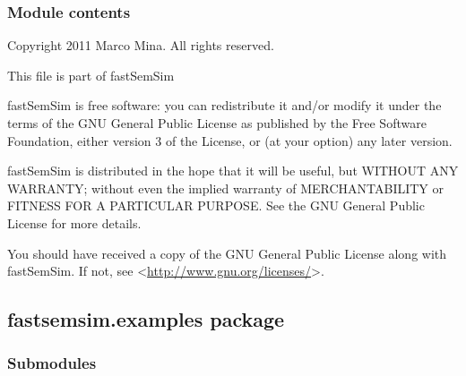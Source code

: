 \documentclass[letterpaper,10pt,english]{sphinxmanual}
\begin{document}
\begin{fulllineitems}
\begin{fulllineitems}
\label{fastsemsim.data:fastsemsim.data.dataset.Dataset.get_ontology}
\end{fulllineitems}


\begin{fulllineitems}
\label{fastsemsim.data:fastsemsim.data.dataset.Dataset.populate}
\end{fulllineitems}


\end{fulllineitems}



\subsubsection{Module contents}
\label{fastsemsim.data:module-fastsemsim.data}\label{fastsemsim.data:module-contents}
Copyright 2011 Marco Mina. All rights reserved.

This file is part of fastSemSim

fastSemSim is free software: you can redistribute it and/or modify
it under the terms of the GNU General Public License as published by
the Free Software Foundation, either version 3 of the License, or
(at your option) any later version.

fastSemSim is distributed in the hope that it will be useful,
but WITHOUT ANY WARRANTY; without even the implied warranty of
MERCHANTABILITY or FITNESS FOR A PARTICULAR PURPOSE.  See the
GNU General Public License for more details.

You should have received a copy of the GNU General Public License
along with fastSemSim.  If not, see \textless{}\href{http://www.gnu.org/licenses/}{http://www.gnu.org/licenses/}\textgreater{}.


\subsection{fastsemsim.examples package}
\label{fastsemsim.examples:fastsemsim-examples-package}\label{fastsemsim.examples::doc}

\subsubsection{Submodules}
\label{fastsemsim.examples:submodules}
\end{document}
